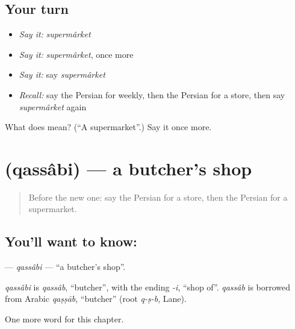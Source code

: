 \subsection*{Your turn}
\begin{itemize}
\raggedright
  \item \emph{Say it:} \emph{supermârket}
  \item \emph{Say it:} \emph{supermârket}, once more
  \item \emph{Say it:} say \emph{supermârket}
  \item \emph{Recall:} say the Persian for weekly, then the Persian for a store, then say \emph{supermârket} again
\end{itemize}

\begin{tcolorbox}[breakable,colback=teal!4,colframe=teal!35!black,title={Before you move on}]
What does  mean? (\textquotedblleft{}A supermarket\textquotedblright{}.) Say it once more.
\end{tcolorbox}
\section[\texorpdfstring{\fa{قصابی} (qassâbi)}{قصابی (qassâbi)}]{ (qassâbi) — a butcher's shop}

\label{lesson:FA-C154-qassabi}



\begin{quote}
Before the new one: say the Persian for a store, then the Persian for a supermarket.
\end{quote}

\subsection*{You'll want to know: }
\textbf{} — \emph{qassâbi} — \textquotedblleft{}a butcher's shop\textquotedblright{}.

\begin{cousinweb}
\emph{qassâbi} is \emph{qassâb}, \textquotedblleft{}butcher\textquotedblright{}, with the ending \emph{-i}, \textquotedblleft{}shop of\textquotedblright{}. \emph{qassâb} is borrowed from Arabic \emph{qaṣṣāb}, \textquotedblleft{}butcher\textquotedblright{} (root \emph{q-ṣ-b}, Lane).
\end{cousinweb}

\begin{grammarlens}[title={What you've built}]
One more word for this chapter.
\end{grammarlens}


